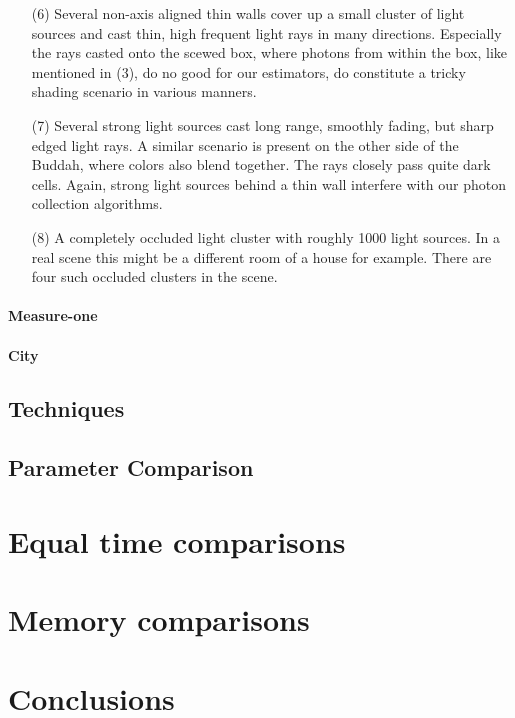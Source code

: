 \begin{itemize}
    \item[(6)] Several non-axis aligned thin walls cover up a small cluster of light sources and cast thin, high frequent light rays in many directions. Especially the rays casted onto the scewed box, where photons from within the box, like mentioned in (3), do no good for our estimators, do constitute a tricky shading scenario in various manners.
    \item[(7)] Several strong light sources cast long range, smoothly fading, but sharp edged light rays. A similar scenario is present on the other side of the Buddah, where colors also blend together. The rays closely pass quite dark cells. Again, strong light sources behind a thin wall interfere with our photon collection algorithms.
    \item[(8)] A completely occluded light cluster with roughly 1000 light sources. In a real scene this might be a different room of a house for example. There are four such occluded clusters in the scene.
\label{li:stanfordmuseum}
\end{itemize}
\paragraph{Measure-one}




\paragraph{City}




\subsection{Techniques}


\subsection{Parameter Comparison}



\label{ch:ev:photontree}

\label{ch:ev:cdftree}


\label{ch:ev:photonsampling}


\label{ch:ev:uniformfloor}


\section{Equal time comparisons}

\section{Memory comparisons}

\section{Conclusions}
